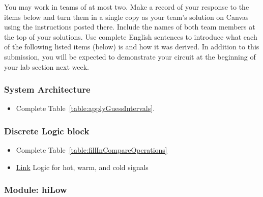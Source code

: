 You may work in teams of at most two. Make a record of your response to
the items below and turn them in a single copy as your team's solution
on Canvas using the instructions posted there. Include the names of both
team members at the top of your solutions. Use complete English
sentences to introduce what each of the following listed items (below)
is and how it was derived. In addition to this submission, you will be
expected to demonstrate your circuit at the beginning of your lab
section next week.

\subsubsection{System Architecture}
\begin{itemize}
\item Complete Table~\ref{table:applyGuessIntervals}.
\end{itemize}

\subsubsection{Discrete Logic block}
\begin{itemize}
\item Complete Table~\ref{table:fillInCompareOperations}

\item \protect\hyperlink{hotWarmCold_Logic}{Link} Logic for hot, warm, and
cold signals
\end{itemize}


\subsubsection{Module: hiLow}

